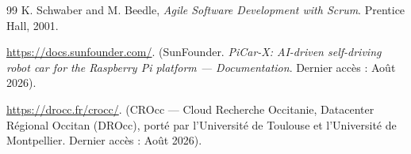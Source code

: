 \begin{thebibliography}{99}
K. Schwaber and M. Beedle, \textit{Agile Software Development with Scrum}.
Prentice Hall, 2001.

\url{https://docs.sunfounder.com/}. (SunFounder. \textit{PiCar-X: AI-driven
self-driving robot car for the Raspberry Pi platform --- Documentation}. Dernier
accès : Août 2026).

\url{https://drocc.fr/crocc/}. (CROcc --- Cloud Recherche Occitanie, Datacenter
Régional Occitan (DROcc), porté par l'Université de Toulouse et l'Université de
Montpellier. Dernier accès : Août 2026).

\end{thebibliography}

